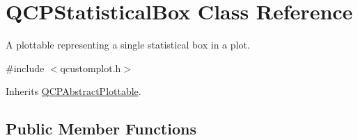 \hypertarget{class_q_c_p_statistical_box}{\section{Q\-C\-P\-Statistical\-Box Class Reference}
\label{class_q_c_p_statistical_box}
}


A plottable representing a single statistical box in a plot.  




{\ttfamily \#include $<$qcustomplot.\-h$>$}



Inherits \hyperlink{class_q_c_p_abstract_plottable}{Q\-C\-P\-Abstract\-Plottable}.

\subsection*{Public Member Functions}

